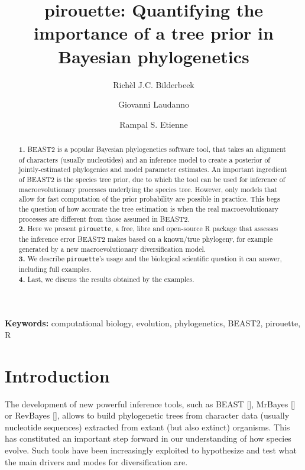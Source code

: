 \documentclass{article}
\title{
  pirouette:
  Quantifying the importance of a tree prior in Bayesian phylogenetics
}
\author[1]{Rich\`el J.C. Bilderbeek}
\author[1]{Giovanni Laudanno}
\author[1]{Rampal S. Etienne}
\affil[1]{Groningen Institute for Evolutionary Life Sciences, University of 
Groningen, Groningen, The Netherlands}
\begin{document}
\maketitle

\begin{abstract}

  \textbf{1. }
    BEAST2 is a popular Bayesian phylogenetics software tool,
    that takes an alignment of characters (usually nucleotides) 
    and an inference model to create a
    posterior of jointly-estimated phylogenies and model parameter 
    estimates. An important ingredient of BEAST2 is 
    the species tree prior, 
    due to which the tool can be used for inference of 
    macroevolutionary processes underlying the species tree. 
    However, only models that allow for fast computation of 
    the prior probability are possible in practice. 
    This begs the question of how accurate the tree estimation is 
    when the real macroevolutionary processes are different 
    from those assumed in BEAST2. \\
  \textbf{2. }
    Here we present \verb;pirouette;, 
    a free, libre and open-source R package that assesses 
    the inference error BEAST2 makes based on a known/true 
    phylogeny, for example generated by a new 
    macroevolutionary diversification model. \\
  \textbf{3. }
    We describe \verb;pirouette;'s usage and the biological scientific
    question it can answer, including full examples. \\
  \textbf{4. }
    Last, we discuss the results obtained by the examples. \\
\end{abstract}

{\bf Keywords:} computational biology, evolution, phylogenetics, BEAST2, 
pirouette, R

\section{Introduction}

The development of new powerful inference tools, 
such as BEAST [\cite{drummond2007beast}], 
MrBayes [\cite{huelsenbeck2001mrbayes}]
or RevBayes [\cite{hohna2016revbayes}], 
allows to build phylogenetic trees 
from character data (usually nucleotide sequences) extracted 
from extant (but also extinct) organisms.
This has constituted an important step forward 
in our understanding of how species evolve.
Such tools have been increasingly exploited to hypothesize 
and test what the main drivers and modes for diversification are.
\end{document}
